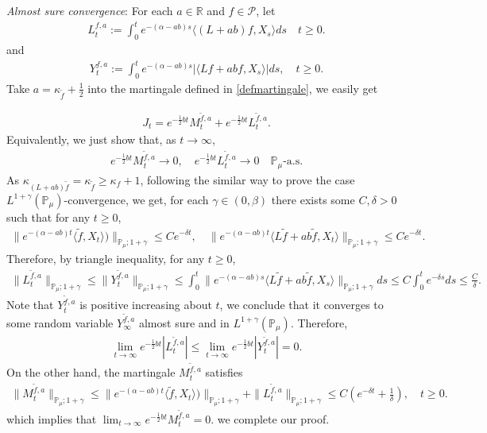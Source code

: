 \documentclass[12pt,oneside,english]{amsart}
\theoremstyle{plain}
\theoremstyle{definition}
\numberwithin{equation}{section}
\begin{document}
{\em Almost sure convergence}: For each $a\in \mathbb{R}$ and $f\in \mathcal{P}$, let
\begin{align}
L_t^{f,a}:=\int_0^t e^{-(\alpha-ab)s}\langle (L+ab)f,X_s\rangle ds \quad t\geq 0.
\end{align}
and
\begin{align}
    Y_t^{f,a}:=\int_0^t e^{-(\alpha-ab)s}|\langle Lf+abf,X_s\rangle|ds, \quad t\geq0.
\end{align}
 Take $a=\kappa_{\tilde{f}}+\frac{1}{2}$ into the martingale defined in \eqref{defmartingale}, we easily get

\begin{align*}
    J_t=e^{-\frac{1}{2}bt} M_t^{\tilde{f},a}+e^{-\frac{1}{2}bt}L_t^{\tilde{f},a}.
\end{align*}
Equivalently, we just show that, as $t\rightarrow \infty$,
\begin{align*}
    e^{-\frac{1}{2}bt}M_t^{\tilde{f},a}\rightarrow 0, \quad e^{-\frac{1}{2}bt}L_t^{\tilde{f},a}\rightarrow 0 \quad \mathbb{P}_{\mu}\text{-a.s.}
\end{align*}
As $\kappa_{(L+ab)\tilde{f}}=\kappa_{\tilde{f}}\geq \kappa_f+1$, following the similar way to prove the case $L^{1+\gamma}(\mathbb{P}_{\mu})$-convergence, we get, for each $\gamma\in (0,\beta)$ there exists some $C, \delta>0$ such that for any $t\geq 0$,
\begin{align}
    \|e^{-(\alpha-ab)t}\langle \tilde{f},X_t\rangle)\|_{\mathbb{P}_{\mu};1+\gamma}\leq C e^{-\delta t},\quad \|e^{-(\alpha-ab)t}\langle L\tilde{f}+ab\tilde{f},X_t\rangle\|_{\mathbb{P}_{\mu};1+\gamma}\leq C e^{-\delta t}.
\end{align}
Therefore, by triangle inequality, for any $t\geq 0$,
\begin{align*}
    \|L_t^{\tilde{f},a}\|_{\mathbb{P}_{\mu};1+\gamma}\leq\|Y_t^{\tilde{f},a}\|_{\mathbb{P}_{\mu};1+\gamma}\leq \int_0^t \|e^{-(\alpha-ab)s}\langle L\tilde{f}+ab\tilde{f},X_s\rangle\|_{\mathbb{P}_{\mu};1+\gamma}ds\leq C \int_0^t e^{-\delta s}ds\leq\frac{C}{\delta}.
\end{align*}
Note that $Y_t^{\tilde{f},a}$ is positive increasing about $t$, we conclude that it converges to some random variable $Y_{\infty}^{\tilde{f},a}$ almost sure and in $L^{1+\gamma}(\mathbb{P}_{\mu})$.
Therefore,
\begin{align*}
    \lim_{t\rightarrow \infty}e^{-\frac{1}{2}bt}|L_t^{\tilde{f},a}|\leq  \lim_{t\rightarrow \infty}e^{-\frac{1}{2}bt}|Y_t^{\tilde{f},a}|=0.
\end{align*}
On the other hand, the martingale $M_t^{\tilde{f},a}$ satisfies
\begin{align*}
    \|M_t^{\tilde{f},a}\|_{\mathbb{P}_{\mu};1+\gamma}\leq  \|e^{-(\alpha-ab)t}\langle \tilde{f},X_t\rangle)\|_{\mathbb{P}_{\mu};1+\gamma}+\|L_t^{\tilde{f},a}\|_{\mathbb{P}_{\mu};1+\gamma}\leq C(e^{-\delta t}+\frac{1}{\delta}),\quad t\geq 0.
\end{align*}
which implies that $\lim_{t\rightarrow\infty} e^{-\frac{1}{2}bt}M_t^{\tilde{f},a}=0$. we complete our proof.
\end{document}
